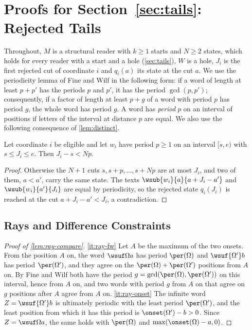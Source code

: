 \section{Proofs for Section~\ref{sec:tails}: Rejected Tails}
\label{app:tails}

Throughout, $M$ is a structural reader with $k\ge1$ starts and $N\ge2$
states, which holds for every reader with a start and a hole
(\cref{sec:tails}), $W$ is a hole, $J_i$ is the first rejected cut of coordinate $i$ and
$q_i(a)$ its state at the cut $a$. We use the periodicity lemma of Fine and
Wilf \cite{FineWilf65} in the following form: if a word of length at least
$p+p'$ has the periods $p$ and $p'$, it has the period $\gcd(p,p')$;
consequently, if a factor of length at least $p+g$ of a word with period $p$
has period $g$, the whole word has period $g$. A word has \emph{period} $p$
on an interval of positions if letters of the interval at distance $p$ are
equal. We also use the following consequence of \cref{lem:distinct}.

\begin{lemma}
\label{lem:before-J}
Let coordinate $i$ be eligible and let $w_i$ have period $p\ge1$ on an
interval $[s,e)$ with $s\le J_i\le e$. Then $J_i-s<Np$.
\end{lemma}

\begin{proof}
Otherwise the $N+1$ cuts $s,s+p,\dots,s+Np$ are at most $J_i$, and two of
them, $a<a'$, carry the same state. The texts $\wsub{w_i}{a}{a+J_i-a'}$ and
$\wsub{w_i}{a'}{J_i}$ are equal by periodicity, so the rejected state
$q_i(J_i)$ is reached at the cut $a+J_i-a'<J_i$, a contradiction.
\end{proof}

\subsection{Rays and Difference Constraints}\label{app:tails-rays}

\begin{proof}[Proof of \cref{lem:ray-compare}]
\eqref{it:ray-fw} Let $A$ be the maximum of the two onsets. From the
position $A$ on, the word $\wsuf\Omega a$ has period $\per(\Omega)$ and
$\wsuf{\Omega'}b$ has period $\per(\Omega')$, and they agree on the
$\per(\Omega)+\per(\Omega')$ positions from $A$ on. By Fine and Wilf both
have the period $g=\gcd(\per(\Omega),\per(\Omega'))$ on this interval, hence
from $A$ on, and two words with period $g$ from $A$ on that agree on $g$
positions after $A$ agree from $A$ on. \eqref{it:ray-onset} The infinite
word $Z=\wsuf{\Omega'}b$ is ultimately periodic with the least period
$\per(\Omega')$, and the least position from which it has this period is
$\onset(\Omega')-b>0$. Since $Z=\wsuf\Omega a$, the same holds with
$\per(\Omega)$ and $\max(\onset(\Omega)-a,0)$.
\end{proof}

